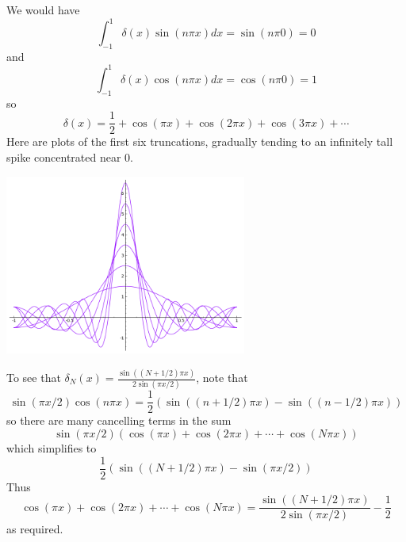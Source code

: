 \documentclass[12pt]{article}
\begin{document}
\begin{answer}
We would have
\[\int_{-1}^1\delta(x)\sin(n\pi x)dx=\sin(n\pi 0)=0\]
and
\[\int_{-1}^1\delta(x)\cos(n\pi x)dx=\cos(n\pi 0)=1\]
so
\[\delta(x)=\frac{1}{2}+\cos(\pi x)+\cos(2\pi x)+\cos(3\pi x)+\cdots\]
Here are plots of the first six truncations, gradually tending to an infinitely tall spike concentrated near 0.

\begin{center}\includegraphics[width=300px]{delta-all.png}\end{center}

To see that $\delta_N(x)=\frac{\sin((N+1/2)\pi x)}{2\sin(\pi x/2)}$, note that
\[\sin(\pi x/2)\cos(n\pi x)=\frac{1}{2}(\sin((n+1/2)\pi x)-\sin((n-1/2)\pi x))\]
so there are many cancelling terms in the sum
\[\sin(\pi x/2)(\cos(\pi x)+\cos(2\pi x)+\cdots+\cos(N\pi x))\]
which simplifies to
\[\frac{1}{2}(\sin((N+1/2)\pi x)-\sin(\pi x/2))\]
Thus
\[\cos(\pi x)+\cos(2\pi x)+\cdots+\cos(N\pi x)=\frac{\sin((N+1/2)\pi x)}{2\sin(\pi x/2)}-\frac{1}{2}\]
as required.
\end{answer}
\end{document}
